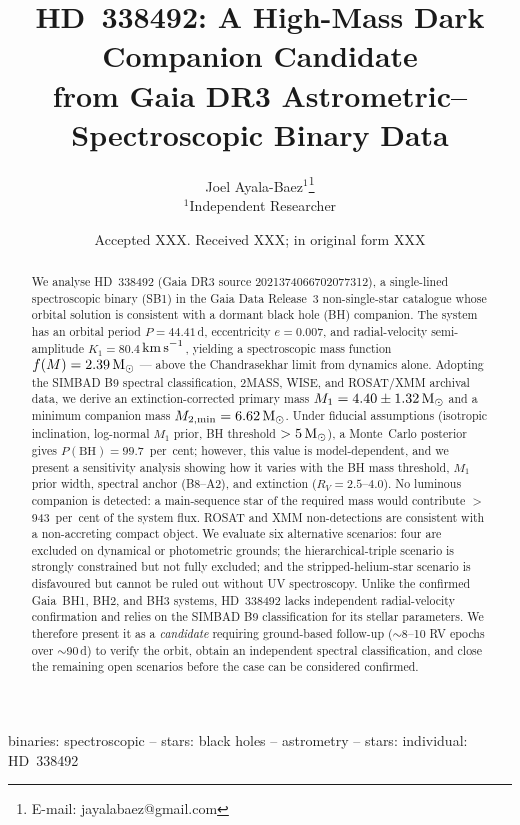 \documentclass[usenatbib,fleqn]{mnras}
\title[HD~338492: A High-Mass Dark Companion Candidate]
{HD~338492: A High-Mass Dark Companion Candidate\\
 from Gaia DR3 Astrometric--Spectroscopic Binary Data}
\author[J. Ayala-Baez]{
  Joel Ayala-Baez$^{1}$\thanks{E-mail: jayalabaez@gmail.com}\\
  $^{1}$Independent Researcher
}
\date{Accepted XXX. Received XXX; in original form XXX}
\newcommand{\Msun}{{\rm M}_\odot}
\newcommand{\kms}{{\rm km\,s}^{-1}}
\newcommand{\fmass}{f(M)}
\begin{document}
\label{firstpage}
\pagerange{\pageref{firstpage}--\pageref{LastPage}}
\maketitle

\begin{abstract}
We analyse HD~338492 (Gaia DR3 source 2021374066702077312), a
single-lined spectroscopic binary (SB1) in the Gaia Data Release~3
non-single-star catalogue whose orbital solution is consistent with a
dormant black hole (BH) companion.  The system has an orbital period
$P = 44.41$\,d, eccentricity $e = 0.007$, and radial-velocity
semi-amplitude $K_1 = 80.4$\,$\kms$, yielding a spectroscopic mass
function $\fmass = 2.39\,\Msun$ --- above the Chandrasekhar limit
from dynamics alone.  Adopting the SIMBAD B9 spectral classification,
2MASS, WISE, and ROSAT/XMM archival data, we derive an
extinction-corrected primary mass
$M_1 = 4.40 \pm 1.32\,\Msun$ and a minimum companion mass
$M_{2,\min} = 6.62\,\Msun$.  Under fiducial assumptions (isotropic
inclination, log-normal $M_1$ prior, BH threshold $> 5\,\Msun$), a
Monte~Carlo posterior gives $P(\text{BH}) = 99.7$~per~cent; however,
this value is model-dependent, and we present a sensitivity analysis
showing how it varies with the BH mass threshold, $M_1$ prior width,
spectral anchor (B8--A2), and extinction ($R_V = 2.5$--$4.0$).  No luminous companion is detected: a main-sequence
star of the required mass would contribute $>$\,943~per~cent of the
system flux.  ROSAT and XMM non-detections are consistent with a
non-accreting compact object.  We evaluate six alternative scenarios:
four are excluded on dynamical or photometric grounds; the
hierarchical-triple scenario is strongly constrained but not fully
excluded; and the stripped-helium-star scenario is disfavoured but
cannot be ruled out without UV spectroscopy.  Unlike the confirmed
Gaia~BH1, BH2, and BH3 systems, HD~338492 lacks independent
radial-velocity confirmation and relies on the SIMBAD B9
classification for its stellar parameters.  We therefore present
it as a \emph{candidate} requiring ground-based follow-up
($\sim$8--10 RV epochs over $\sim$90\,d) to verify the orbit,
obtain an independent spectral classification, and close the
remaining open scenarios before the case can be considered confirmed.
\end{abstract}

\begin{keywords}
binaries: spectroscopic -- stars: black holes -- astrometry --
stars: individual: HD~338492
\end{keywords}
\end{document}
